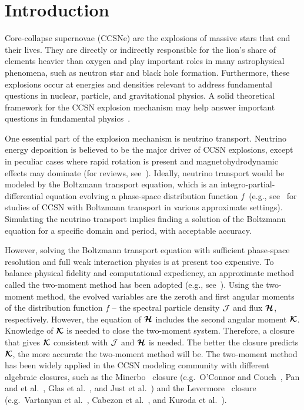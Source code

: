 \section{Introduction}

Core-collapse supernovae (CCSNe) are the explosions of massive stars that end their lives.
They are directly or indirectly responsible for the lion's share of elements heavier than oxygen and play important roles in many astrophysical phenomena, such as neutron star and black hole formation.
Furthermore, these explosions occur at energies and densities relevant to address fundamental questions in nuclear, particle, and gravitational physics. 
A solid theoretical framework for the CCSN explosion mechanism may help answer important questions in fundamental physics~\cite{janka_etal_2007}.

One essential part of the explosion mechanism is neutrino transport.
Neutrino energy deposition is believed to be the major driver of CCSN explosions, except in peculiar cases where rapid rotation is present and magnetohydrodynamic effects may dominate (for reviews, see~\cite{mezzacappa_2005,janka_2012,burrows_2013,muller_2016}).
Ideally, neutrino transport would be modeled by the Boltzmann transport equation, which is an integro-partial-differential equation evolving a phase-space distribution function $f$~(e.g., see~\cite{mezzacappaBruenn_1993a,mezzacappaBruenn_1993b,mezzacappaBruenn_1993c,mezzacappa_etal_2001,liebendoerfer_etal_2001,liebendoerfer_etal_2004,livne_etal_2004,liebendoerfer_etal_2005,ott_etal_2008,sumiyoshiYamada_2012,nagakura_etal_2014,sumiyoshi_etal_2014,nagakura_etal_2018} for studies of CCSN with Boltzmann transport in various approximate settings).
Simulating the neutrino transport implies finding a solution of the Boltzmann equation for a specific domain and period, with acceptable accuracy.

However, solving the Boltzmann transport equation with sufficient phase-space resolution and full weak interaction physics is at present too expensive.
To balance physical fidelity and computational expediency, an approximate method called the two-moment method has been adopted (e.g., see~\cite{kuroda_etal_2016,roberts_etal_2016,just_etal_2018,vartanyan_etal_2018}).
Using the two-moment method, the evolved variables are the zeroth and first angular moments of the distribution function $f$ -- the spectral particle density $\mathcal{J}$ and flux $\boldsymbol{\mathcal{H}}$, respectively.
However, the equation of $\boldsymbol{\mathcal{H}}$ includes the second angular moment $\boldsymbol{\mathcal{K}}$.
Knowledge of $\boldsymbol{\mathcal{K}}$ is needed to close the two-moment system.
Therefore, a closure that gives $\boldsymbol{\mathcal{K}}$ consistent with $\mathcal{J}$ and $\boldsymbol{\mathcal{H}}$ is needed.
The better the closure predicts $\boldsymbol{\mathcal{K}}$, the more accurate the two-moment method will be. 
The two-moment method has been widely applied in the CCSN modeling community with different algebraic closures, such as the Minerbo~\cite{minerbo_1978} closure (e.g.~{O'Connor} and {Couch}~\cite{oConnorCouch_2018}, Pan and et al.~\cite{pan_etal_2018}, Glas et al.~\cite{glas_etal_2018}, and Just et al.~\cite{just_etal_2018}) and the Levermore~\cite{levermore_1984} closure (e.g.~Vartanyan et al.~\cite{vartanyan_etal_2018}, Cabezon et al.~\cite{cabezon_etal_2018}, and Kuroda et al.~\cite{kuroda_etal_2016}). 

